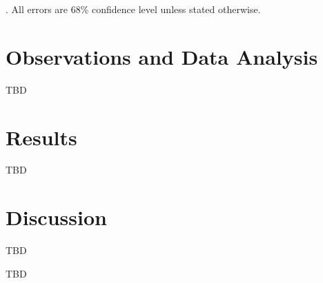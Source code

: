\documentclass[iop]{emulateapj-rtx4}
\begin{document}
\LCDM. All errors are 68\% confidence level unless stated
otherwise.

\section{Observations and Data Analysis}
\label{sec:obs}

TBD

\section{Results}
\label{sec:r&d}

TBD

\section{Discussion}
\label{sec:summary}

TBD

\acknowledgements

TBD





\clearpage


\end{document}
